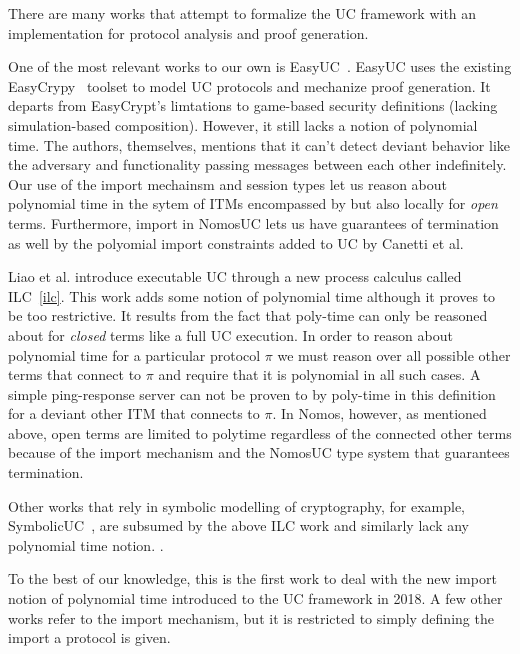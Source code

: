 There are many works that attempt to formalize the UC framework with an implementation for protocol analysis and proof generation.

One of the most relevant works to our own is EasyUC~\cite{easyuc}. 
EasyUC uses the existing EasyCrypy~\cite{easycrypt} toolset to model UC protocols and mechanize proof generation. 
It departs from EasyCrypt's limtations to game-based security definitions (lacking simulation-based composition).
However, it still lacks a notion of polynomial time. The authors, themselves, mentions that it can't detect deviant behavior like the adversary and functionality passing messages between each other indefinitely. 
Our use of the import mechainsm and session types let us reason about polynomial time in the sytem of ITMs encompassed by  but also locally for \textit{open} terms. 
Furthermore, import in NomosUC lets us have guarantees of termination as well by the polyomial import constraints added to UC by Canetti et al.

Liao et al. introduce executable UC through a new process calculus called ILC~\ref{ilc}.
This work adds some notion of polynomial time although it proves to be too restrictive. 
It results from the fact that poly-time can only be reasoned about for \textit{closed} terms like a full UC execution.
In order to reason about polynomial time for a particular protocol $\pi$ we must reason over all possible other terms that connect to $\pi$ and require that it is polynomial in all such cases.
A simple ping-response server can not be proven to by poly-time in this definition for a deviant other ITM that connects to $\pi$. 
In Nomos, however, as mentioned above, open terms are limited to polytime regardless of the connected other terms because of the import mechanism and the NomosUC type system that guarantees termination. 

Other works that rely in symbolic modelling of cryptography, for example, SymbolicUC~\cite{symbolicuc}, are subsumed by the above ILC work and similarly lack any polynomial time notion. 
.


To the best of our knowledge, this is the first work to deal with the new import notion of polynomial time introduced to the UC framework in 2018.
A few other works refer to the import mechanism, but it is restricted to simply defining the import a protocol is given.
	
